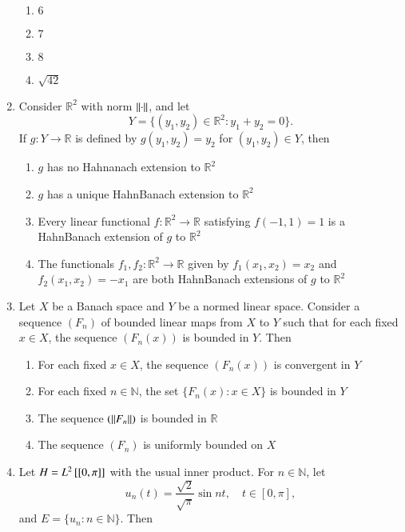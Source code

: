 \documentclass[journal,12pt,onecolumn]{IEEEtran}
\theoremstyle{remark}
\begin{document}
\begin{enumerate}
\begin{enumerate}[label=(\Alph*)]
\item $6$
\item $7$
\item $8$
\item $\sqrt{42}$
\end{enumerate}

\item Consider $\mathbb{R}^2$ with norm $\left\lVert\cdot\right\rVert$, and let 
\[
Y = \{(y_1,y_2) \in \mathbb{R}^2 : y_1 + y_2 = 0\}.
\]
If $g : Y \to \mathbb{R}$ is defined by $g(y_1,y_2) = y_2$ for $(y_1,y_2) \in Y$, then  
\\[-0.3em]\makebox[\textwidth][r]{\textit{[GATE EE 2025]}}

\begin{enumerate}[label=(\Alph*)]
\item $g$ has no Hahnanach extension to $\mathbb{R}^2$
\item $g$ has a unique HahnBanach extension to $\mathbb{R}^2$
\item Every linear functional $f : \mathbb{R}^2 \to \mathbb{R}$ satisfying $f(-1,1) = 1$ is a HahnBanach extension of $g$ to $\mathbb{R}^2$
\item The functionals $f_1, f_2 : \mathbb{R}^2 \to \mathbb{R}$ given by $f_1(x_1,x_2) = x_2$ and $f_2(x_1,x_2) = -x_1$ are both HahnBanach extensions of $g$ to $\mathbb{R}^2$
\end{enumerate}

\item Let $X$ be a Banach space and $Y$ be a normed linear space. Consider a sequence $(F_n)$ of bounded linear maps from $X$ to $Y$ such that for each fixed $x \in X$, the sequence $(F_n(x))$ is bounded in $Y$. Then
\\[-0.3em]\makebox[\textwidth][r]{\textit{[GATE EE 2025]}}

\begin{enumerate}[label=(\Alph*)]
\item For each fixed $x \in X$, the sequence $(F_n(x))$ is convergent in $Y$
\item For each fixed $n \in \mathbb{N}$, the set $\{F_n(x) : x \in X\}$ is bounded in $Y$
\item The sequence $(\left\lVert F_n\right\rVert)$ is bounded in $\mathbb{R}$
\item The sequence $(F_n)$ is uniformly bounded on $X$
\end{enumerate}

\item Let $H = L^2{}\left[[0,\pi]\right]$ with the usual inner product. For $n \in \mathbb{N}$, let
\[
u_n(t) = \frac{\sqrt{2}}{\sqrt{\pi}} \sin nt, \quad t \in [0,\pi], 
\]
and $E = \{u_n : n \in \mathbb{N}\}$. Then
\\[-0.3em]\makebox[\textwidth][r]{\textit{[GATE EE 2025]}}


\end{enumerate}
\end{document}

